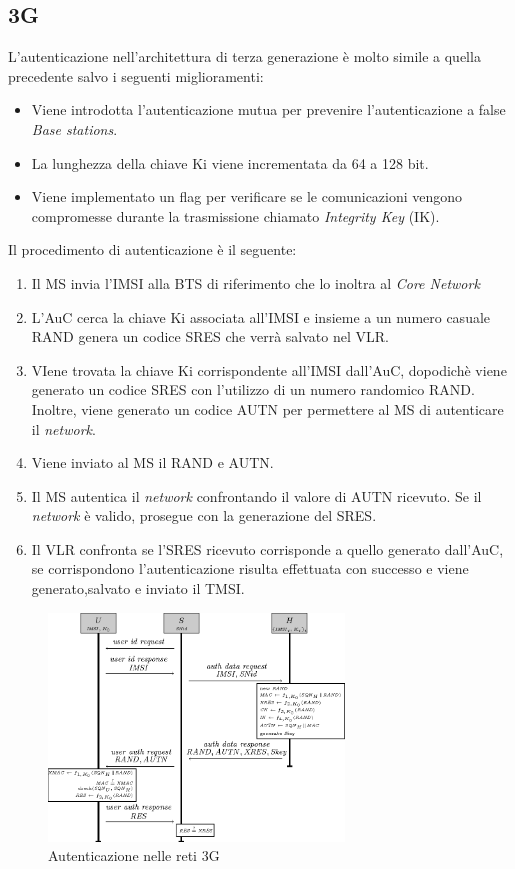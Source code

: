 \subsection{3G}
L'autenticazione nell'architettura di terza generazione è molto simile a quella precedente salvo i seguenti miglioramenti:
\begin{itemize}
    \item Viene introdotta l'autenticazione mutua per prevenire l'autenticazione a false \textit{Base stations}.
    \item La lunghezza della chiave Ki viene incrementata da 64 a 128 bit.
    \item Viene implementato un flag per verificare se le comunicazioni vengono compromesse durante la trasmissione chiamato \textit{Integrity Key} (IK).
\end{itemize}
Il procedimento di autenticazione è il seguente:
\begin{enumerate}
    \item Il MS invia l'IMSI alla BTS di riferimento che lo inoltra al \textit{Core Network}
    \item L'AuC cerca la chiave Ki associata all'IMSI e insieme a un numero casuale RAND genera un codice SRES che verrà
    salvato nel VLR.
    \item VIene trovata la chiave Ki corrispondente all'IMSI dall'AuC, dopodichè viene generato un codice SRES con l'utilizzo di un numero randomico RAND.
    Inoltre, viene generato un codice AUTN per permettere al MS di autenticare il \textit{network}.
    \item Viene inviato al MS il RAND e AUTN.
    \item Il MS autentica il \textit{network} confrontando il valore di AUTN ricevuto. Se il \textit{network} è valido, prosegue con la generazione del SRES.
    \item Il VLR confronta se l'SRES ricevuto corrisponde a quello generato dall'AuC, se corrispondono l'autenticazione risulta
    effettuata con successo e viene generato,salvato e inviato il TMSI.
\end{enumerate}
\begin{figure}[h]
    \centering
    \includegraphics[width=0.7\textwidth]{images/auth-3g.png}
    \caption{Autenticazione nelle reti 3G}
\end{figure}

